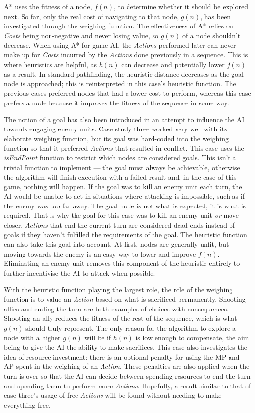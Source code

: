 \documentclass[11pt, a4paper]{report}
\begin{document}
A* uses the fitness of a node, $f(n)$, to determine whether it should be explored next. So far, only the real cost of navigating to that node, $g(n)$, has been investigated through the weighing function. The effectiveness of A* relies on \emph{Costs} being non-negative and never losing value, so $g(n)$ of a node shouldn't decrease. When using A* for game AI, the \emph{Actions} performed later can never make up for \emph{Costs} incurred by the \emph{Actions} done previously in a sequence. This is where heuristics are helpful, as $h(n)$ can decrease and potentially lower $f(n)$ as a result. In standard pathfinding, the heuristic distance decreases as the goal node is approached; this is reinterpreted in this case's heuristic function. The previous cases preferred nodes that had a lower cost to perform, whereas this case prefers a node because it improves the fitness of the sequence in some way. 

The notion of a goal has also been introduced in an attempt to influence the AI towards engaging enemy units. Case study three worked very well with its elaborate weighing function, but its goal was hard-coded into the weighing function so that it preferred \emph{Actions} that resulted in conflict. This case uses the \emph{isEndPoint} function to restrict which nodes are considered goals. This isn't a trivial function to implement --- the goal must always be achievable, otherwise the algorithm will finish execution with a failed result and, in the case of this game, nothing will happen. If the goal was to kill an enemy unit each turn, the AI would be unable to act in situations where attacking is impossible, such as if the enemy was too far away. The goal node is not what is expected; it is what is required. That is why the goal for this case was to kill an enemy unit \emph{or} move closer. \emph{Actions} that end the current turn are considered dead-ends instead of goals if they haven't fulfilled the requirements of the goal. The heuristic function can also take this goal into account. At first, nodes are generally unfit, but moving towards the enemy is an easy way to lower and improve $f(n)$. Eliminating an enemy unit removes this component of the heuristic entirely to further incentivise the AI to attack when possible. 

With the heuristic function playing the largest role, the role of the weighing function is to value an \emph{Action} based on what is sacrificed permanently. Shooting allies and ending the turn are both examples of choices with consequences. Shooting an ally reduces the fitness of the rest of the sequence, which is what $g(n)$ should truly represent. The only reason for the algorithm to explore a node with a higher $g(n)$ will be if $h(n)$ is low enough to compensate, the aim being to give the AI the ability to make sacrifices. This case also investigates the idea of resource investment: there is an optional penalty for using the MP and AP spent in the weighing of an \emph{Action}. These penalties are also applied when the turn is over so that the AI can decide between spending resources to end the turn and spending them to perform more \emph{Actions}. Hopefully, a result similar to that of case three's usage of free \emph{Actions} will be found without needing to make everything free.
\end{document}

